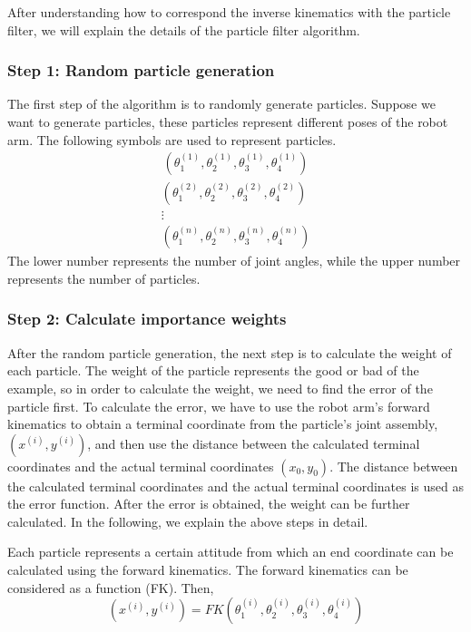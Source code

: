 \documentclass[journal,article,submit,pdftex,moreauthors]{Definitions/mdpi}
\begin{document}
After understanding how to correspond the inverse kinematics with the particle filter, we will explain the details of the particle filter algorithm.

\subsubsection{Step 1: Random particle generation}
The first step of the algorithm is to randomly generate particles. Suppose we want to generate  particles, these  particles represent  different poses of the robot arm. The following symbols are used to represent  particles.
\begin{align}
(\theta_1^{(1)},\theta_2^{(1)},\theta_3^{(1)},\theta_4^{(1)})
\end{align}
\begin{align*}
(\theta_1^{(2)},\theta_2^{(2)},\theta_3^{(2)},\theta_4^{(2)})\\
\vdots \\
(\theta_1^{(n)},\theta_2^{(n)},\theta_3^{(n)},\theta_4^{(n)})
\end{align*}
The lower number represents the number of joint angles, while the upper number represents the number of particles.

\subsubsection{Step 2: Calculate importance weights}
After the random particle generation, the next step is to calculate the weight of each particle. The weight of the particle represents the good or bad of the example, so in order to calculate the weight, we need to find the error of the particle first. To calculate the error, we have to use the robot arm's forward kinematics to obtain a terminal coordinate from the particle's joint assembly, $(x^{(i)},y^{(i)})$, and then use the distance between the calculated terminal coordinates and the actual terminal coordinates $(x_0,y_0)$. The distance between the calculated terminal coordinates and the actual terminal coordinates is used as the error function. After the error is obtained, the weight can be further calculated. In the following, we explain the above steps in detail.

Each particle represents a certain attitude from which an end coordinate can be calculated using the forward kinematics. The forward kinematics can be considered as a function (FK). Then,
$$(x^{(i)},y^{(i)})=FK(\theta_1^{(i)},\theta_2^{(i)},\theta_3^{(i)},\theta_4^{(i)})$$
\end{document}
